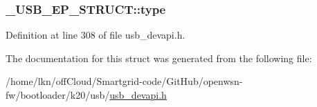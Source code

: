 \subsubsection[{\texorpdfstring{type}{type}}]{ \+\_\+\+U\+S\+B\+\_\+\+E\+P\+\_\+\+S\+T\+R\+U\+C\+T\+::type}\hypertarget{struct___u_s_b___e_p___s_t_r_u_c_t_a65e53e8c8de50af93de7169566dc7259}{}\label{struct___u_s_b___e_p___s_t_r_u_c_t_a65e53e8c8de50af93de7169566dc7259}


Definition at line 308 of file usb\+\_\+devapi.\+h.



The documentation for this struct was generated from the following file\+:\begin{DoxyCompactItemize}
\item 
/home/lkn/off\+Cloud/\+Smartgrid-\/code/\+Git\+Hub/openwsn-\/fw/bootloader/k20/usb/\hyperlink{usb__devapi_8h}{usb\+\_\+devapi.\+h}\end{DoxyCompactItemize}
